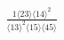 \documentclass[varwidth, border=5pt]{standalone}
\begin{document}
\begin{my}
$\begin{gathered}
\scriptscriptstyle\frac{1⟨23⟩⟨14⟩^2}{⟨13⟩^2⟨15⟩⟨45⟩}
\end{gathered}$
\end{my}
\end{document}
